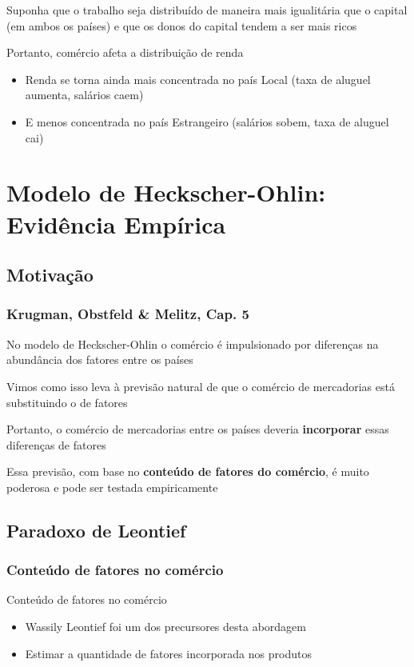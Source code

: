 \documentclass[a4paper,12pt]{article}[abntex2]
\begin{document}
Suponha que o trabalho seja distribuído de maneira mais igualitária que o capital (em ambos os países) e que os donos do capital tendem a ser mais ricos

Portanto, comércio afeta a distribuição de renda
\begin{itemize}
    \item Renda se torna ainda mais concentrada no país Local (taxa de aluguel aumenta, salários caem)
    \item E menos concentrada no país Estrangeiro (salários sobem, taxa de aluguel cai)
\end{itemize}

\newpage
\section{\textbf{Modelo de Heckscher-Ohlin: Evidência Empírica}}
\subsection{\textbf{Motivação}}
\subsubsection{\textbf{Krugman, Obstfeld \& Melitz, Cap. 5}}
No modelo de Heckscher-Ohlin o comércio é impulsionado por diferenças na abundância dos fatores entre os países

Vimos como isso leva à previsão natural de que o comércio de mercadorias está substituindo o de fatores

Portanto, o comércio de mercadorias entre os países deveria \textbf{incorporar} essas diferenças de fatores

Essa previsão, com base no \textbf{conteúdo de fatores do comércio}, é muito poderosa e pode ser testada empiricamente

\subsection{\textbf{Paradoxo de Leontief}}
\subsubsection{\textbf{Conteúdo de fatores no comércio}}
Conteúdo de fatores no comércio\begin{itemize}
    \item Wassily Leontief foi um dos precursores desta abordagem
    \item Estimar a quantidade de fatores incorporada nos produtos
\end{itemize}
\end{document}

